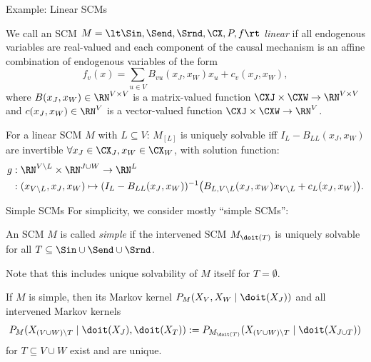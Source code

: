 \begin{frame}{Example: Linear SCMs}
  \begin{Def}[\ref{def:linear_scms}]
We call an SCM $M=\lt \Sin, \Send, \Srnd, \CX, P, f \rt$
\emph{linear} if all endogenous variables are real-valued and
each component of the causal mechanism is an affine combination of endogenous variables of the form
$$
    f_v(x) = \sum_{u\in V} B_{vu}(x_J,x_W) x_u + c_v(x_J,x_W),
$$
    where $B(x_J,x_W)\in\RN^{V \times V}$ is a matrix-valued function $\CXJ\times\CXW \to \RN^{V\times V}$ and
$c(x_J,x_W) \in \RN^V$ is a vector-valued function $\CXJ\times\CXW \to \RN^V$.
  \end{Def}

\begin{Prp}[\ref{prp:linear_scms}]
For a linear SCM $M$ with $L \subseteq V$:
$M_{[L]}$ is uniquely solvable iff 
$I_{L}-B_{LL}(x_J,x_W)$ are invertible $\forall x_J \in \CX_J, x_W \in \CX_W$,
with solution function:
\small
  \begin{equation*}\begin{split}
    g &: \RN^{V\setminus L} \times \RN^{J\cup W} \to \RN^L \\
      &: (x_{V\setminus L},x_J,x_W) \mapsto (I_L - B_{LL}(x_J,x_W))^{-1} \big(B_{L,{V\setminus L}}(x_J,x_W) x_{V\setminus L} + c_{L}(x_J,x_W)\big).
  \end{split}\end{equation*}
  \end{Prp}
\end{frame}

\begin{frame}{Simple SCMs}
For simplicity, we consider mostly ``simple SCMs'':
\begin{Def}[\ref{def:simple_scm}]
  An SCM $M$ is called \emph{simple} if the intervened SCM
  $M_{\doit(T)}$ is uniquely solvable for all $T \subseteq \Sin \cup \Send \cup \Srnd$. 
\end{Def}
Note that this includes unique solvability of $M$ itself for $T = \emptyset$.
\begin{Cor}[\ref{cor:simple_scm}]
  If $M$ is simple, then its Markov kernel $P_{M}(X_V, X_W \mid \doit(X_J))$ and all intervened Markov kernels
  $$P_{M}(X_{(V \cup W) \setminus T} \mid \doit(X_J),\doit(X_T)) := P_{M_{\doit(T)}}(X_{(V \cup W)\setminus T} \mid \doit(X_{J \cup T}))$$
  for $T \subseteq V \cup W$ exist and are unique.
\end{Cor}
\end{frame}

